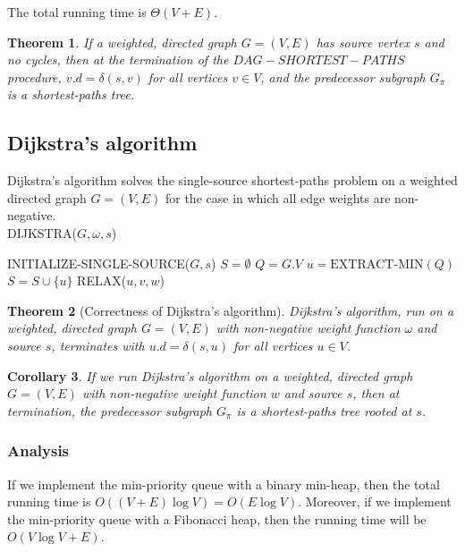 \documentclass[12pt]{article}
\newtheorem{theorem}{Theorem}
\newtheorem{corollary}[theorem]{Corollary}
\begin{document}
The total running time is $\Theta(V+E)$.

\begin{theorem}
  If a weighted, directed graph $G = (V,E)$ has source vertex $s$ and no cycles, then at the termination of the $DAG-SHORTEST-PATHS$ procedure, $v.d=\delta(s,v)$ for all vertices $v \in V$, and the predecessor subgraph $G_{\pi}$ is a shortest-paths tree.
\end{theorem}

\subsection{Dijkstra's algorithm}

Dijkstra's algorithm solves the single-source shortest-paths problem on a weighted directed graph $G = (V,E)$ for the case in which all edge weights are non-negative. \\

DIJKSTRA($G, \omega, s$)
\begin{algorithmic} [1]
\State INITIALIZE-SINGLE-SOURCE($G,s$)
\State $S = \emptyset$
\State $Q = G.V$
	\State $u = \text{EXTRACT-MIN}(Q)$
	\State $S = S \cup \{ u \}$
		\State RELAX($u,v,w$)
        \EndFor
\EndWhile
\end{algorithmic}

\begin{theorem} [Correctness of Dijkstra's algorithm]
  Dijkstra's algorithm, run on a weighted, directed graph $G = (V,E)$ with non-negative weight function $\omega$ and source $s$, terminates with $u.d = \delta(s,u)$ for all vertices $u \in V$.
\end{theorem}

\begin{corollary}
  If we run Dijkstra's algorithm on a weighted, directed graph $G = (V,E)$ with non-negative weight function $w$ and source $s$, then at termination, the predecessor subgraph $G_{\pi}$ is a shortest-paths tree rooted at $s$.
\end{corollary}

\subsubsection*{Analysis}

If we  implement the min-priority queue with a binary min-heap, then the total running time is $O((V+E)\log V) = O(E \log V)$. Moreover, if we implement the min-priority queue with a Fibonacci heap, then the running time will be $O(V \log V + E)$.
\end{document}
